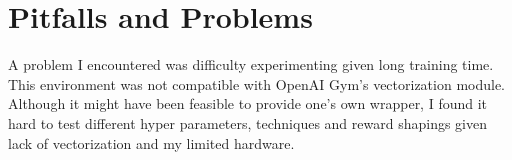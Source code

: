 \documentclass[conference]{IEEEtran}
\begin{document}
\section{Pitfalls and Problems}
A problem I encountered was difficulty experimenting given long training time. This environment was not compatible with OpenAI Gym's vectorization
module. Although it might have been feasible to provide one's own wrapper, I found it hard to test different hyper parameters, techniques and reward shapings
given lack of vectorization and my limited hardware. 
\end{document}
